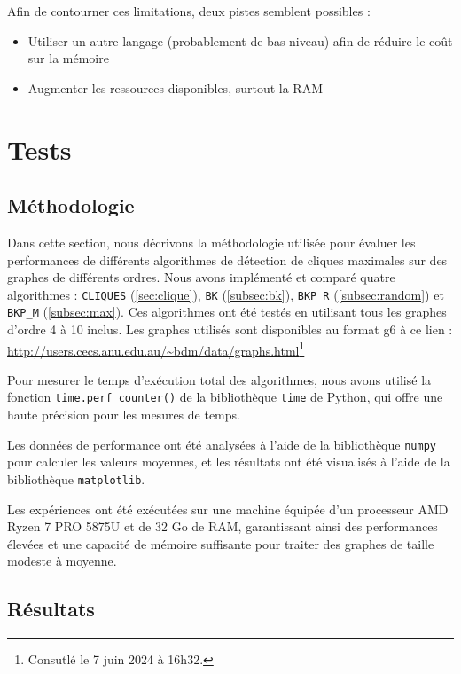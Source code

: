 \documentclass[12pt,a4paper]{article}
\begin{document}
Afin de contourner ces limitations, deux pistes semblent possibles :
\begin{itemize}
  \item Utiliser un autre langage (probablement de bas niveau) afin de réduire le coût sur la mémoire
  \item Augmenter les ressources disponibles, surtout la RAM
\end{itemize}

\section{Tests}%
\label{sec:tests}

\subsection{Méthodologie}%
\label{subsec:methodo}
Dans cette section, nous décrivons la méthodologie utilisée pour évaluer les performances de différents algorithmes de détection de cliques maximales sur des graphes de différents ordres. Nous avons implémenté et comparé quatre algorithmes : \texttt{CLIQUES} (\ref{sec:clique}), \texttt{BK} (\ref{subsec:bk}), \texttt{BKP\_R} (\ref{subsec:random}) et \texttt{BKP\_M} (\ref{subsec:max}). Ces algorithmes ont été testés en utilisant tous les graphes d'ordre 4 à 10 inclus. Les graphes utilisés sont disponibles au format g6 à ce lien : \url{http://users.cecs.anu.edu.au/~bdm/data/graphs.html}\footnote{Consutlé le 7 juin 2024 à 16h32.}

Pour mesurer le temps d'exécution total des algorithmes, nous avons utilisé la fonction \texttt{time.perf\_counter()} de la bibliothèque \texttt{time} de Python, qui offre une haute précision pour les mesures de temps.

Les données de performance ont été analysées à l'aide de la bibliothèque \texttt{numpy} pour calculer les valeurs moyennes, et les résultats ont été visualisés à l'aide de la bibliothèque \texttt{matplotlib}.

Les expériences ont été exécutées sur une machine équipée d'un processeur AMD Ryzen 7 PRO 5875U et de 32 Go de RAM, garantissant ainsi des performances élevées et une capacité de mémoire suffisante pour traiter des graphes de taille modeste à moyenne.

\subsection{Résultats}%
\label{subsec:res}
\end{document}
